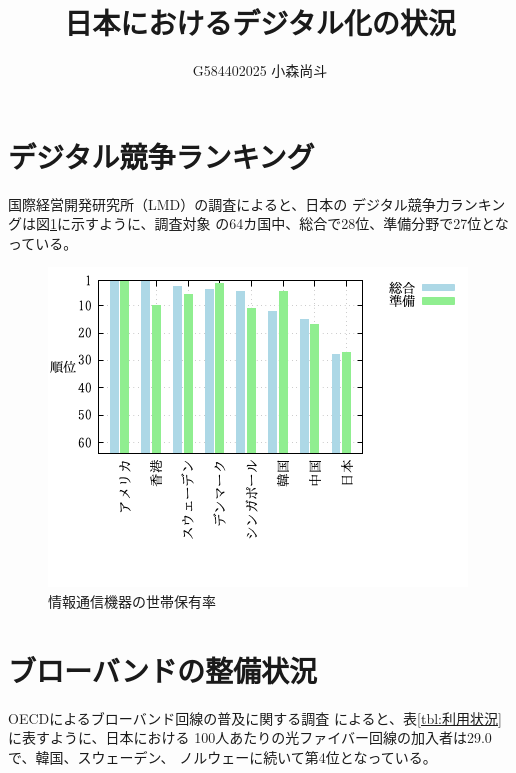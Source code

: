 \documentclass[a4paper,11pt,dvipdfmx]{ujarticle}
\title{日本におけるデジタル化の状況}
\author{G584402025 小森尚斗}
\begin{document}
\maketitle %
\section{デジタル競争ランキング}
国際経営開発研究所（LMD）の調査\cite{imd}によると、日本の
デジタル競争力ランキングは図\ref{fig:保有率}に示すように、調査対象
の64カ国中、総合で28位、準備分野で27位となっている。

\begin{figure}[htbp]
    \centering
    \includegraphics[width=0.7\linewidth]{fig51.png}
    \caption{情報通信機器の世帯保有率}\label{fig:保有率}
\end{figure}





\section{ブローバンドの整備状況}
OECDによるブローバンド回線の普及に関する調査\cite{oecd}
によると、表\ref{tbl:利用状況}に表すように、日本における
100人あたりの光ファイバー回線の加入者は29.0で、韓国、スウェーデン、
ノルウェーに続いて第4位となっている。
\end{document}
